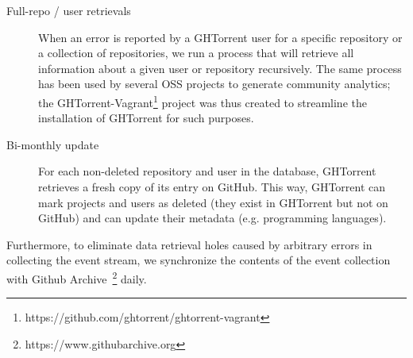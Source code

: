 \documentclass{sig-alternate}
\begin{document}
\begin{description}

  \item[Full-repo / user retrievals] When an error is reported by a GHTorrent
    user for a specific repository or a collection of repositories, we run a
    process that will retrieve all information about a given user or repository
    recursively. The same process has been used by several OSS projects to
    generate community analytics; the
    GHTorrent-Vagrant\footnote{https://github.com/ghtorrent/ghtorrent-vagrant}
    project was thus created to streamline the installation of GHTorrent for
    such purposes.

  \item[Bi-monthly update] For each non-deleted repository and user in the
    database, GHTorrent retrieves a fresh copy of its entry on GitHub. This way,
    GHTorrent can mark projects and users as deleted (they exist in GHTorrent
    but not on GitHub) and can update their metadata (e.g. programming
    languages).

\end{description}

Furthermore, to eliminate data retrieval holes caused by arbitrary errors in
collecting the event stream, we synchronize the contents of the event collection
with Github Archive~\footnote{https://www.githubarchive.org} daily.
\end{document}

